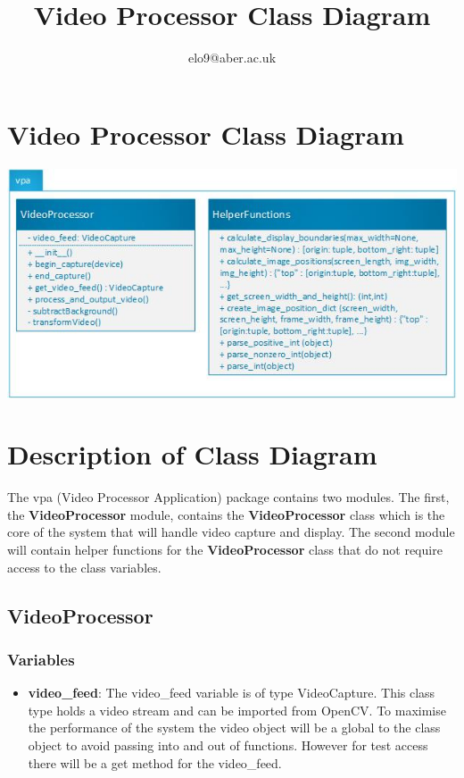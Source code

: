 \documentclass{article}
\title{Video Processor Class Diagram}
\author{elo9@aber.ac.uk}
\begin{document}
\maketitle
\tableofcontents

\newpage

\section{Video Processor Class Diagram}
\includegraphics[width=\textwidth]{VideoProcessorClassDiagramImage}


\section{Description of Class Diagram}
The vpa (Video Processor Application) package contains two modules. The first, the \textbf{VideoProcessor} module, contains the \textbf{VideoProcessor} class which is the core of the system that will handle video capture and display. The second module will contain helper functions for the \textbf{VideoProcessor} class that do not require access to the class variables.

\subsection{VideoProcessor}
\subsubsection{Variables}
\begin{itemize}

	\item \textbf{video\_feed}: The video\_feed variable is of type VideoCapture. This class type holds a video stream and can be imported from OpenCV. To maximise the performance of the system the video object will be a global to the class object to avoid passing into and out of functions. However for test access there will be a get method for the video\_feed.
\end{itemize}
\end{document}

